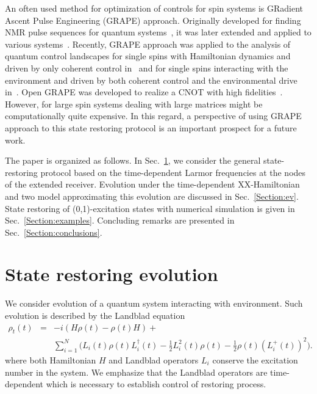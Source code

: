 \documentclass[pra,preprint,showpacs]{revtex4-1}
\begin{document}
An often used method for optimization of controls for spin systems is GRadient Ascent Pulse Engineering (GRAPE) approach. {Originally developed for finding NMR pulse sequences for quantum systems}~\cite{Khaneja2005}, it was later extended and applied to various systems~\cite{GlaserJPB2011,Fouquieres2011,PechenTannor2011,Lucarelli2018,PP_2023}. Recently, GRAPE approach was applied to the analysis of quantum control landscapes for single spins with Hamiltonian dynamics and driven by only coherent control in~\cite{VMP_21} and for single spins interacting with the environment and driven by both coherent control and the environmental drive in~\cite{PP_2023}. Open GRAPE was developed to realize a CNOT with high fidelities~\cite{GlaserJPB2011}. However, for large spin systems dealing with large matrices might be computationally quite expensive. In this regard, a perspective of using GRAPE approach to this state restoring protocol is an important prospect for a future work.

The paper is organized as follows. In Sec.~\ref{Section:T}, we consider the general state-restoring protocol based on the time-dependent Larmor frequencies at the nodes of the extended receiver. Evolution under the time-dependent XX-Hamiltonian and two model approximating this evolution are discussed in Sec.~\ref{Section:ev}. State restoring of (0,1)-excitation states with numerical simulation is given in Sec.~\ref{Section:examples}. Concluding remarks are presented in Sec.~\ref{Section:conclusions}.

\fi

\section{State restoring evolution}
\label{Section:T}

We consider evolution of a quantum system interacting with 	environment. Such evolution is described by the  Landblad equation
\begin{eqnarray}\label{rho00}
 \rho_t(t)&=&-i (H\rho(t) - \rho(t) H) +\\\nonumber
&& \sum_{i=1}^N \Big(L_i(t) \rho(t) L_i^\dagger(t)
-\frac{1}{2} L_i^2(t)\rho(t) -\frac{1}{2} \rho(t) (L_i^+(t))^2\Big).
\end{eqnarray}
where both Hamiltonian $H$ and Landblad operators $L_i$ conserve the excitation number in the system. We emphasize that the Landblad operators are time-dependent which is necessary  to establish control of restoring process.
\end{document}
